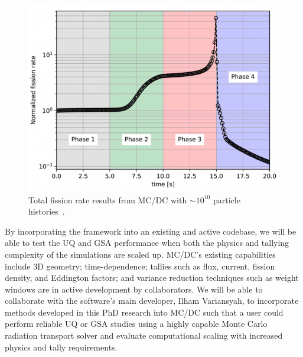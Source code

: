 \begin{figure}
    \centering
    \includegraphics[width=\textwidth]{Figures/fission.png}
    \caption{Total fission rate results from MC/DC with $\sim 10^{10}$ particle histories~\cite{psaap-presentation}.}
    \label{fig:fission}
\end{figure}

By incorporating the framework into an existing and active codebase, we will be able to test the UQ and GSA performance when both the physics and tallying complexity of the simulations are scaled up. MC/DC's existing capabilities include 3D geometry; time-dependence; tallies such as flux, current, fission density, and Eddington factors; and variance reduction techniques such as weight windows are in active development by collaborators. We will be able to collaborate with the software's main developer, Ilham Variansyah, to incorporate methods developed in this PhD research into MC/DC such that a user could perform reliable UQ or GSA studies using a highly capable Monte Carlo radiation transport solver and evaluate computational scaling with increased physics and tally requirements. 